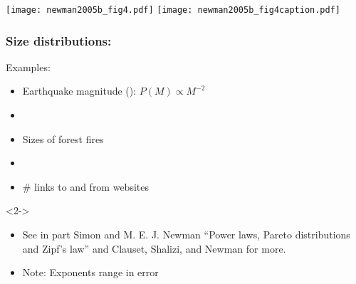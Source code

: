 \begin{frame}

  \begin{block}{}
    \texttt{[image: newman2005b\_fig4.pdf]}
    \texttt{[image: newman2005b\_fig4caption.pdf]}
  \end{block}

\end{frame}

\begin{frame}
  \frametitle{Size distributions:}

  \begin{block}{Examples:}
    \begin{itemize}
    \item 
      Earthquake magnitude ():\cite{gutenberg1942a,bak2002a} $P(M) \propto M^{-2}$
    \item 
    \item 
      Sizes of forest fires\cite{grassberger2002a}
    \item 
    \item 
      \# links to and from websites\cite{barabasi1999a}
    \end{itemize}
  \end{block}

  \begin{block}<2->{}
    \begin{itemize}
    \item 
      See in part Simon\cite{simon1955a} and 
      M. E. J. Newman\cite{newman2005b}
      ``Power laws, Pareto distributions and Zipf's law''
      and Clauset, Shalizi, and Newman\cite{clauset2009b} for more.
    \item 
      Note: Exponents range in error
    \end{itemize}
  \end{block}

\end{frame}


